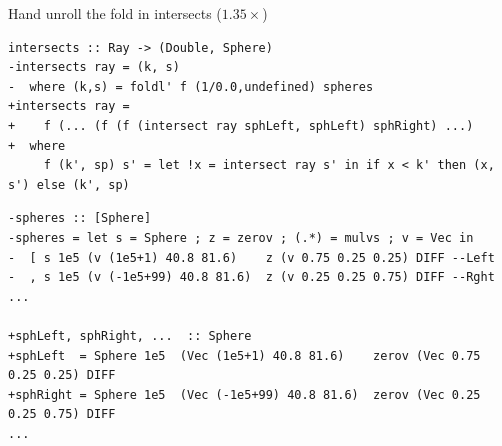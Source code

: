 \documentclass[8pt]{beamer}
\begin{document}
\begin{frame}[fragile]{Hand unroll the fold in intersects ($1.35\times$)}

\begin{verbatim}
intersects :: Ray -> (Double, Sphere)
-intersects ray = (k, s)
-  where (k,s) = foldl' f (1/0.0,undefined) spheres
+intersects ray =
+    f (... (f (f (intersect ray sphLeft, sphLeft) sphRight) ...)
+  where
     f (k', sp) s' = let !x = intersect ray s' in if x < k' then (x, s') else (k', sp)
\end{verbatim}


\begin{verbatim}
-spheres :: [Sphere]
-spheres = let s = Sphere ; z = zerov ; (.*) = mulvs ; v = Vec in
-  [ s 1e5 (v (1e5+1) 40.8 81.6)    z (v 0.75 0.25 0.25) DIFF --Left
-  , s 1e5 (v (-1e5+99) 40.8 81.6)  z (v 0.25 0.25 0.75) DIFF --Rght
...

+sphLeft, sphRight, ...  :: Sphere
+sphLeft  = Sphere 1e5  (Vec (1e5+1) 40.8 81.6)    zerov (Vec 0.75 0.25 0.25) DIFF
+sphRight = Sphere 1e5  (Vec (-1e5+99) 40.8 81.6)  zerov (Vec 0.25 0.25 0.75) DIFF
...
\end{verbatim}

\end{frame}
\end{document}
